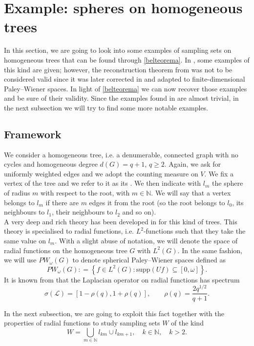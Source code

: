 \documentclass[12pt]{amsart}
\theoremstyle{definition}
\numberwithin{equation}{section}
\theoremstyle{definition}
\theoremstyle{remark}
\numberwithin{equation}{section}
\begin{document}
\section{Example: spheres on homogeneous trees}
In this section, we are going to look into some examples of sampling sets on homogeneous trees that can be found through \ref{belteorema}. In \cite{PW1}, some examples of this kind are given; however, the reconstruction theorem from \cite{PW1} was not to be considered valid since it was later corrected in \cite{PW2} and adapted to finite-dimensional Paley--Wiener spaces. In light of \ref{belteorema} we can now recover those examples and be sure of their validity. Since the examples found in \cite{PW1} are almost trivial, in the next subsection we will try to find some more notable examples.

\subsection{Framework}
We consider a homogeneous tree, i.e. a denumerable, connected graph with no cycles and homogeneous degree $d(G) = q+1$, $q \geq 2$. Again, we ask for uniformly weighted edges and we adopt the counting measure on $V$. We fix a vertex of the tree and we refer to it as its . We then indicate with $l_m$ the sphere of radius $m$ with respect to the root, with $m \in \mathbb{N}$. We will say that a vertex belongs to $l_m$ if there are $m$ edges  it from the root (so the root belongs to $l_0$, its neighbours to $l_1$, their neighbours to $l_2$ and so on).\\
A very deep and rich theory has been developed in \cite{figa} for this kind of trees. This theory is specialised to radial functions, i.e. $L^2$-functions such that they take the same value on $l_m$. With a slight abuse of notation, we will denote the space of radial functions on the homogeneous tree $G$ with $L^2(G)$. In the same fashion, we will use $PW_\omega(G)$ to denote spherical Paley--Wiener spaces defined as 
$$
PW_\omega(G): =  \left\{f \in L^2(G): \mathrm{supp}(Uf)\subseteq[0, \omega]\right\}.
$$
It is known from \cite{figa} that the Laplacian operator on radial functions has spectrum
\begin{equation}
\label{homspect}
    \sigma(\mathcal{L}) = [1- \rho(q), 1+ \rho(q)], \qquad \rho(q) = \frac{2 q^{1/2}}{q+1}.
\end{equation}

In the next subsection, we are going to exploit this fact together with the properties of radial functions to study sampling sets $W$ of the kind $$W = \bigcup_{m \in \mathbb{N}}l_{km}\cup l_{km+1},\quad k \in \mathbb{N}, \quad k>2.$$
\end{document}
